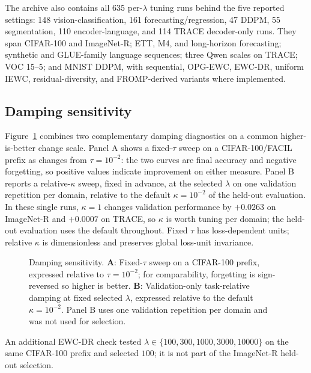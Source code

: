 The archive also contains all 635 per-$\lambda$ tuning runs behind the five reported settings: 148 vision-classification, 161 forecasting/regression, 47 DDPM, 55 segmentation, 110 encoder-language, and 114 TRACE decoder-only runs. They span CIFAR-100 and ImageNet-R; ETT, M4, and long-horizon forecasting; synthetic and GLUE-family language sequences; three Qwen scales on TRACE; VOC 15--5; and MNIST DDPM, with sequential, OPG-EWC, EWC-DR, uniform IEWC, residual-diversity, and FROMP-derived variants where implemented.

\subsection{Damping sensitivity}

Figure~\ref{fig:damping-sensitivity} combines two complementary damping diagnostics on a common higher-is-better change scale. Panel A shows a fixed-$\tau$ sweep on a CIFAR-100/FACIL prefix as changes from $\tau=10^{-2}$: the two curves are final accuracy and negative forgetting, so positive values indicate improvement on either measure. Panel B reports a relative-$\kappa$ sweep, fixed in advance, at the selected $\lambda$ on one validation repetition per domain, relative to the default $\kappa=10^{-2}$ of the held-out evaluation. In these single runs, $\kappa=1$ changes validation performance by $+0.0263$ on ImageNet-R and $+0.0007$ on TRACE, so $\kappa$ is worth tuning per domain; the held-out evaluation uses the default throughout. Fixed $\tau$ has loss-dependent units; relative $\kappa$ is dimensionless and preserves global loss-unit invariance.

\begin{figure}[H]
\centering

\caption[Damping sensitivity]{Damping sensitivity. \textbf{A}: Fixed-$\tau$ sweep on a CIFAR-100 prefix, expressed relative to $\tau=10^{-2}$; for comparability, forgetting is sign-reversed so higher is better. \textbf{B}: Validation-only task-relative damping at fixed selected $\lambda$, expressed relative to the default $\kappa=10^{-2}$. Panel B uses one validation repetition per domain and was not used for selection.}
\label{fig:damping-sensitivity}
\end{figure}


An additional EWC-DR check tested $\lambda\in\{100,300,1000,3000,10000\}$ on the same CIFAR-100 prefix and selected $100$; it is not part of the ImageNet-R held-out selection.
